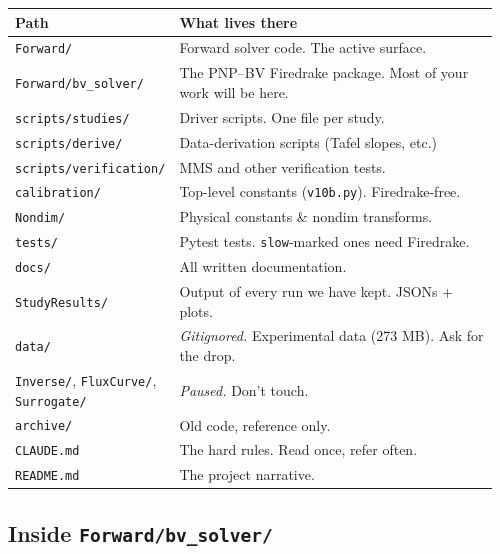 \documentclass[11pt]{article}
\begin{document}
\begin{center}
\begin{tabular}{p{0.30\linewidth} p{0.66\linewidth}}
\toprule
\textbf{Path} & \textbf{What lives there} \\
\midrule
\texttt{Forward/} & Forward solver code. The active surface. \\
\texttt{Forward/bv\_solver/} & The PNP--BV Firedrake package. Most of your work will be here. \\
\texttt{scripts/studies/} & Driver scripts. One file per study. \\
\texttt{scripts/derive/} & Data-derivation scripts (Tafel slopes, etc.) \\
\texttt{scripts/verification/} & MMS and other verification tests. \\
\texttt{calibration/} & Top-level constants (\texttt{v10b.py}). Firedrake-free. \\
\texttt{Nondim/} & Physical constants \& nondim transforms. \\
\texttt{tests/} & Pytest tests. \texttt{slow}-marked ones need Firedrake. \\
\texttt{docs/} & All written documentation. \\
\texttt{StudyResults/} & Output of every run we have kept. JSONs + plots. \\
\texttt{data/} & \emph{Gitignored.} Experimental data (273 MB). Ask for the drop. \\
\texttt{Inverse/}, \texttt{FluxCurve/}, \texttt{Surrogate/} & \emph{Paused.} Don't touch. \\
\texttt{archive/} & Old code, reference only. \\
\texttt{CLAUDE.md} & The hard rules. Read once, refer often. \\
\texttt{README.md} & The project narrative. \\
\bottomrule
\end{tabular}
\end{center}

\subsection{Inside \texttt{Forward/bv\_solver/}}
\end{document}
